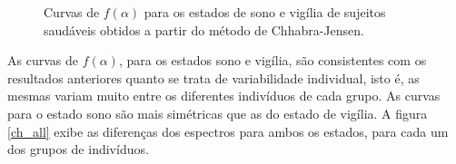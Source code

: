 \documentclass{ufscThesis}
\begin{document}
\begin{figure}[!h]
\center
{}
\quad
{}
\caption{Curvas de $f(\alpha)$ para os estados de sono e vigília de sujeitos saudáveis obtidos a partir do método de Chhabra-Jensen.}
\label{ch_hm}
\end{figure}


As curvas de $f(\alpha)$, para os estados sono e vigília, são consistentes com os resultados anteriores quanto se trata de variabilidade individual, isto é, as mesmas variam muito entre os diferentes indivíduos de cada grupo.
As curvas para o estado sono são mais simétricas que as do estado de vigília. A figura \ref{ch_all} exibe as diferenças dos espectros para ambos os estados, para cada um dos grupos de indivíduos. \par
\end{document}
